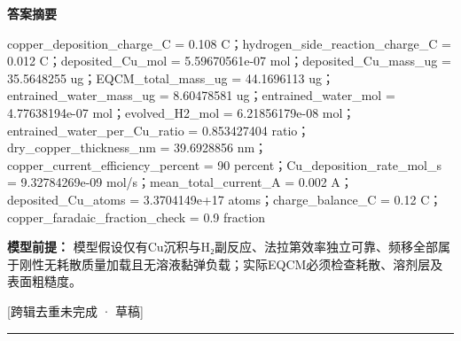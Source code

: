 \documentclass[UTF8,11pt,a4paper]{ctexart}
\begin{document}
\noindent\textbf{答案摘要}\par
copper\_deposition\_charge\_C = 0.108 C；hydrogen\_side\_reaction\_charge\_C = 0.012 C；deposited\_Cu\_mol = 5.59670561e-07 mol；deposited\_Cu\_mass\_ug = 35.5648255 ug；EQCM\_total\_mass\_ug = 44.1696113 ug；entrained\_water\_mass\_ug = 8.60478581 ug；entrained\_water\_mol = 4.77638194e-07 mol；evolved\_H2\_mol = 6.21856179e-08 mol；entrained\_water\_per\_Cu\_ratio = 0.853427404 ratio；dry\_copper\_thickness\_nm = 39.6928856 nm；copper\_current\_efficiency\_percent = 90 percent；Cu\_deposition\_rate\_mol\_s = 9.32784269e-09 mol/s；mean\_total\_current\_A = 0.002 A；deposited\_Cu\_atoms = 3.3704149e+17 atoms；charge\_balance\_C = 0.12 C；copper\_faradaic\_fraction\_check = 0.9 fraction\par
\noindent\textbf{模型前提：}
模型假设仅有Cu沉积与H₂副反应、法拉第效率独立可靠、频移全部属于刚性无耗散质量加载且无溶液黏弹负载；实际EQCM必须检查耗散、溶剂层及表面粗糙度。\par
\noindent\textcolor{red!65!black}{[跨辑去重未完成 · 草稿]} \par
\medskip\hrule\medskip
{}
\end{document}
